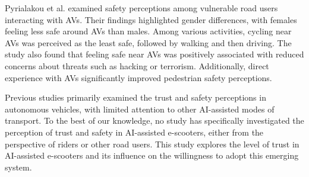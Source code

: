 
Pyrialakou et al. \cite{pyrialakou2020perceptions} examined safety perceptions among vulnerable road users interacting with AVs. Their findings highlighted gender differences, with females feeling less safe around AVs than males. Among various activities, cycling near AVs was perceived as the least safe, followed by walking and then driving. The study also found that feeling safe near AVs was positively associated with reduced concerns about threats such as hacking or terrorism. Additionally, direct experience with AVs significantly improved pedestrian safety perceptions.

Previous studies primarily examined the trust and safety perceptions in autonomous vehicles, with limited attention to other AI-assisted modes of transport. To the best of our knowledge, no study has specifically investigated the perception of trust and safety in AI-assisted e-scooters, either from the perspective of riders or other road users. This study explores the level of trust in AI-assisted e-scooters and its influence on the willingness to adopt this emerging system.


